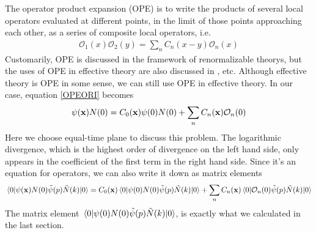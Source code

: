 \documentclass[aps,prd,preprint,showkeys,notitlepage,10pt]{revtex4-1}
\begin{document}
The operator product expansion\cite{Collins1984} (OPE) is to write the products of several local operators evaluated at different points, in the limit of those points approaching each other, as a series of composite local operators, i.e.
\begin{align}
	\mathcal{O}_1(x)\mathcal{O}_2(y)=\sum_nC_n(x-y)\mathcal{O}_n(x)\label{OPEORI}
\end{align}
Customarily, OPE is discussed in the framework of renormalizable theorys, but the uses of OPE in effective theory are also discussed in \cite{Broadhurst1992,Mannel1994,Kawamura2009,Kawamura2009a}, etc. Although effective theory is OPE in some sense, we can still use OPE in effective theory. In our case, equation \eqref{OPEORI} becomes
\begin{align}
	\psi(\vb{x})N(0)=C_0(\vb{x})\psi(0)N(0)+\sum_nC_n(\vb{x})\mathcal{O}_n(0)\label{OPE}
\end{align}
Here we choose equal-time plane to discuss this problem. The logarithmic divergence, which is the highest order of divergence on the left hand side, only appears in the coefficient of the first term in the right hand side. Since it's an equation for operators, we can also write it down as matrix elements
\begin{align}
	\mel{0}{\psi(\vb{x})N(0)\tilde\psi(p)\tilde N(k)}{0}=C_0(\vb{x})\mel{0}{\psi(0)N(0)\tilde\psi(p)\tilde N(k)}{0}+\sum_nC_n(\vb{x})\mel{0}{\mathcal{O}_n(0)\tilde\psi(p)\tilde N(k)}{0}\label{OPEME}
\end{align}
The matrix element $\mel{0}{\psi(0)N(0)\tilde\psi(p)\tilde N(k)}{0}$, is exactly what we calculated in the last section.
\end{document}

